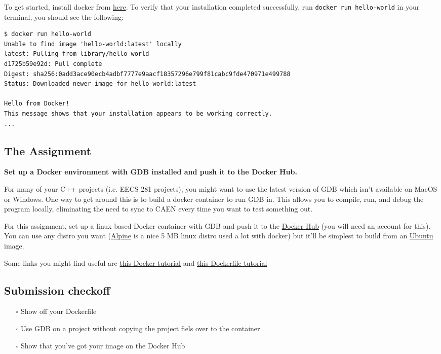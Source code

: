 \documentclass{article}
\begin{document}
To get started, install docker from \href{https://docs.docker.com/install/}{here}.
To verify that your installation completed successfully, run \lstinline{docker run hello-world} in your terminal, you should see the following:

\begin{lstlisting}
$ docker run hello-world
Unable to find image 'hello-world:latest' locally
latest: Pulling from library/hello-world
d1725b59e92d: Pull complete
Digest: sha256:0add3ace90ecb4adbf7777e9aacf18357296e799f81cabc9fde470971e499788
Status: Downloaded newer image for hello-world:latest

Hello from Docker!
This message shows that your installation appears to be working correctly.
...
\end{lstlisting}


\subsection*{The Assignment}

\textbf{Set up a Docker environment with GDB installed and push it to the Docker Hub.}

For many of your C++ projects (i.e. EECS 281 projects), you might want to use the latest 
version of GDB which isn't available on MacOS or Windows. One way to get around this is to
build a docker container to run GDB in. This allows you to compile, run, and debug the program locally, eliminating
the need to sync to CAEN every time you want to test something out.

For this assignment, set up a linux based Docker container with GDB and push it to the \href{https://hub.docker.com/}{Docker Hub} (you will need an account for this).
You can use any distro you want (\href{https://hub.docker.com/_/alpine/}{Alpine} is a nice 5 MB linux distro used a lot with docker) 
but it'll be simplest to build from an \href{https://hub.docker.com/_/ubuntu/}{Ubuntu} image.

Some links you might find useful are \href{https://docker-curriculum.com/}{this Docker tutorial} and \href{https://www.digitalocean.com/community/tutorials/docker-explained-using-dockerfiles-to-automate-building-of-images}{this Dockerfile tutorial}

\subsection*{Submission checkoff}
\begin{itemize}
  \item[$\square$] Show off your Dockerfile
  \item[$\square$] Use GDB on a project without copying the project fiels over to the container
  \item[$\square$] Show that you've got your image on the Docker Hub
\end{itemize}
\end{document}
